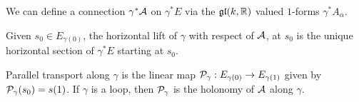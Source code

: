 \begin{definition}

    We can define a connection \(\gamma^*\mathcal{A}\) on \(\gamma^*E\) via the \(\mathfrak{g}\mathfrak{l}(k, \mathbb{R})\) valued \(1\)-forms \(\gamma^*A_\alpha\).
\end{definition}

\begin{definition}
     Given \(s_0 \in E_{\gamma(0)}\), the horizontal lift of \(\gamma\) with respect of \(\mathcal{A}\), at \(s_0\) is the unique horizontal section of \(\gamma^*E\) starting at \(s_0\).

    Parallel transport along \(\gamma\) is the linear map \(\mathcal{P}_\gamma : E_{\gamma(0)} \to E_{\gamma(1)}\) given by \(\mathcal{P}_\gamma(s_0) = s(1)\). If \(\gamma\) is a loop, then \(\mathcal{P}_\gamma\) is the holonomy of \(\mathcal{A}\) along \(\gamma\).
\end{definition}
